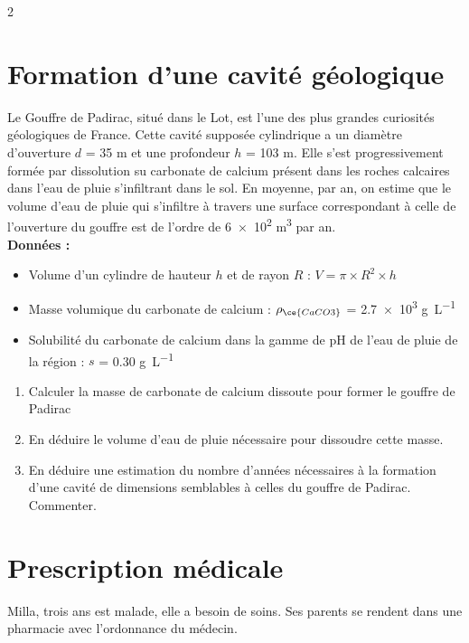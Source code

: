 \documentclass[a4paper,11pt,fleqn]{article}%
\begin{document}
\begin{multicols}{2}
\section{Formation d'une cavité géologique}
Le Gouffre de Padirac, situé dans le Lot, est l’une des plus grandes curiosités géologiques de France. Cette cavité supposée cylindrique a un diamètre d’ouverture $d$ = \num{35} \unit{\meter} et une profondeur $h$ = \num{103} \unit{\meter}. Elle s’est progressivement formée par dissolution su carbonate de calcium  présent dans les roches calcaires dans l’eau de pluie s’infiltrant dans le sol. En moyenne, par an, on estime que le volume d’eau de pluie qui s’infiltre à travers une surface correspondant à celle de l’ouverture du gouffre est de l’ordre de \num{6e2} \unit{\meter \cubed} par an.\\
\textbf{Données :}
\begin{itemize}
	\item Volume d’un cylindre de hauteur $h$ et de rayon $R$ : $V = \pi \times R^2 \times h$
	\item Masse volumique du carbonate de calcium : $\rho_{\ce{CaCO3}}$ = \num{2,7e3} \unit{\gram \per \liter}
	\item Solubilité du carbonate de calcium dans la gamme de pH de l’eau de pluie de la région : $s$ = \num{0,30} \unit{\gram \per \liter}
\end{itemize}
\begin{enumerate}
	\item Calculer la masse de carbonate de calcium dissoute pour former le gouffre de Padirac
	\item En déduire le volume d’eau de pluie nécessaire pour dissoudre cette masse.
	\item En déduire une estimation du nombre d’années nécessaires à la formation d’une cavité de dimensions semblables à celles du gouffre de Padirac. Commenter.
\end{enumerate}
\vspace{1em}

\section{Prescription médicale}
Milla, trois ans est malade, elle a besoin de soins. Ses parents se rendent dans une pharmacie avec l’ordonnance du médecin.\\

\noindent {}



\end{multicols}
\end{document}
